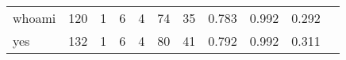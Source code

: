\begin{longtable}{lp{1.10cm}p{1.10cm}p{1.10cm}p{1.10cm}p{1.10cm}p{1.10cm}p{1.10cm}p{1.10cm}p{1.10cm}p{1.10cm}}
whoami    &                    120 &                                  1 &                                 6 &                                4 &                                74 &                              35 &                             0.783 &                                 0.992 &                               0.292 \\
yes       &                    132 &                                  1 &                                 6 &                                4 &                                80 &                              41 &                             0.792 &                                 0.992 &                               0.311 \\
\end{longtable}
